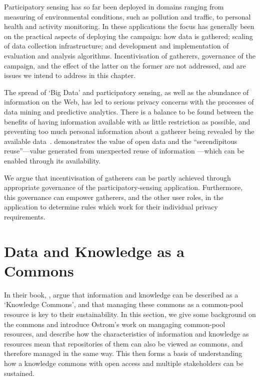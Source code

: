 Participatory sensing has so far been deployed in domains ranging from
measuring of environmental conditions, such as pollution and traffic, to
personal health and activity monitoring. In these applications the focus has
generally been on the practical aspects of deploying the campaign: how data is
gathered; scaling of data collection infrastructure; and development and
implementation of evaluation and analysis algorithms. Incentivisation of
gatherers, governance of the campaign, and the effect of the latter on the
former are not addressed, and are issues we intend to address in this chapter.

The spread of `Big Data' and participatory sensing, as well as the abundance
of information on the Web, has led to serious privacy concerns with the
processes of data mining and predictive analytics. There is a balance to be
found between the benefits of having information available with as little
restriction as possible, and preventing too much personal information about a
gatherer being revealed by the available data~\citep{ohara2010}.
\citet{Shadbolt2012} demonstrates the value of open data and the
``serendipitous reuse''---value generated from unexpected reuse of information
---which can be enabled through its availability.

We argue that incentivisation of gatherers can be partly achieved through
appropriate governance of the participatory-sensing application. Furthermore,
this governance can empower gatherers, and the other user roles, in the
application to determine rules which work for their individual privacy
requirements.

\section{Data and Knowledge as a Commons}\label{sec:commons}

In their book, \citet{Hess2007}, argue that information and knowledge can be
described as a `Knowledge Commons', and that managing these commons as a
common-pool resource is key to their sustainability. In this section, we give
some background on the commons and introduce Ostrom's work on mangaging
common-pool resources, and describe how the characteristics of information and
knowledge as resources mean that repositories of them can also be viewed as
commons, and therefore managed in the same way. This then forms a basis of
understanding how a knowledge commons with open access and multiple
stakeholders can be sustained. %

